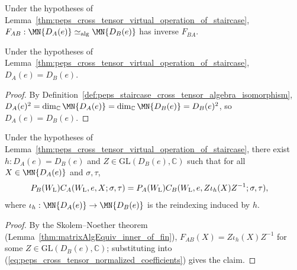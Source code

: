 \begin{definition}%
    \label{def:peps_staircase_cross_tensor_algebra_isomorphism}
    \leanok
    Under the hypotheses of
    Lemma~\ref{thm:peps_cross_tensor_virtual_operation_of_staircase},
    $F_{AB}:\MN{D_A(e)}\simeq_{\mathrm{alg}}\MN{D_B(e)}$ has inverse $F_{BA}$.
\end{definition}

\begin{lemma}%
    \label{thm:peps_staircase_cross_tensor_bond_dimension}
    \leanok
    Under the hypotheses of
    Lemma~\ref{thm:peps_cross_tensor_virtual_operation_of_staircase},
    $D_A(e)=D_B(e)$.
\end{lemma}
\begin{proof}
    \leanok
    By Definition~\ref{def:peps_staircase_cross_tensor_algebra_isomorphism},
    $D_A(e)^2=\dim_{\mathbb C}\MN{D_A(e)}=\dim_{\mathbb C}\MN{D_B(e)}=D_B(e)^2$,
    so $D_A(e)=D_B(e)$.
\end{proof}

\begin{lemma}%
    \label{thm:peps_staircase_cross_tensor_normalized_gauge}
    \leanok
    Under the hypotheses of
    Lemma~\ref{thm:peps_cross_tensor_virtual_operation_of_staircase},
    there exist $h:D_A(e)=D_B(e)$ and $Z\in\mathrm{GL}(D_B(e),\mathbb C)$ such
    that for all $X\in\MN{D_A(e)}$ and $\sigma,\tau$,
    \begin{align}
        P_B(W_{\mathrm L})C_A(W_{\mathrm L},e,X;\sigma,\tau)
         & =P_A(W_{\mathrm L})
        C_B(W_{\mathrm L},e,Z\iota_h(X)Z^{-1};\sigma,\tau),
        \notag
    \end{align}
    where $\iota_h:\MN{D_A(e)}\to\MN{D_B(e)}$ is the reindexing induced by $h$.
\end{lemma}
\begin{proof}
    \leanok
    By the Skolem--Noether theorem
    (Lemma~\ref{thm:matrixAlgEquiv_inner_of_fin}),
    $F_{AB}(X)=Z\iota_h(X)Z^{-1}$ for some $Z\in\mathrm{GL}(D_B(e),\mathbb C)$;
    substituting into (\ref{eq:peps_cross_tensor_normalized_coefficients}) gives
    the claim.
\end{proof}
